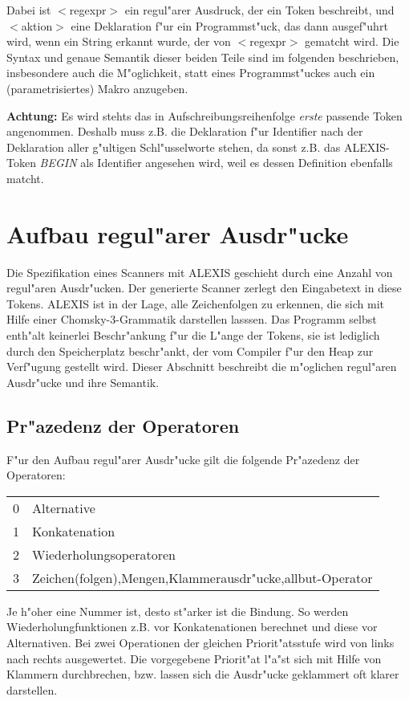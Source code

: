 \medskip

Dabei ist $<$regexpr$>$ ein regul"arer Ausdruck, der ein Token beschreibt, und
$<$aktion$>$ eine Deklaration f"ur ein Programmst"uck, das dann ausgef"uhrt wird,
wenn ein String erkannt wurde, der von $<$regexpr$>$ gematcht wird. Die Syntax und 
genaue Semantik dieser beiden Teile sind im folgenden beschrieben, insbesondere 
auch die M"oglichkeit, statt eines Programmst"uckes auch ein (parametrisiertes)
Makro anzugeben.

{\bf Achtung:} Es wird stehts das in Aufschreibungsreihenfolge {\it erste\/} passende
Token angenommen. Deshalb muss z.B. die Deklaration f"ur Identifier nach der Deklaration
aller g"ultigen Schl"usselworte stehen, da sonst z.B. das ALEXIS-Token {\it BEGIN\/} 
als Identifier angesehen wird, weil es dessen Definition ebenfalls matcht. 
\section{Aufbau regul"arer Ausdr"ucke}
Die Spezifikation eines Scanners mit ALEXIS geschieht durch eine Anzahl von regul"aren
Ausdr"ucken. Der generierte Scanner zerlegt den Eingabetext in diese Tokens.\hfill\break
ALEXIS ist in der Lage, alle Zeichenfolgen zu erkennen, die sich mit Hilfe einer
Chomsky-3-Grammatik darstellen lasssen. Das Programm selbst enth"alt keinerlei
Beschr"ankung f"ur die L"ange der Tokens, sie ist lediglich durch den Speicherplatz 
beschr"ankt, der vom Compiler f"ur den Heap zur Verf"ugung gestellt wird.\hfill\break
Dieser Abschnitt beschreibt die m"oglichen regul"aren Ausdr"ucke und ihre Semantik.
\vfill \eject
\subsection{Pr"azedenz der Operatoren}
F"ur den Aufbau regul"arer Ausdr"ucke gilt die folgende Pr"azedenz der Operatoren:

\medskip

\begin{tabular}{ll}
0&Alternative \\
1&Konkatenation \\
2&Wiederholungsoperatoren \\
3&Zeichen(folgen),Mengen,Klammerausdr"ucke,allbut-Operator\\
\end{tabular}

\medskip

Je h"oher eine Nummer ist, desto st"arker ist die Bindung. So werden Wiederholungfunktionen
z.B. vor Konkatenationen berechnet und diese vor Alternativen. Bei zwei Operationen der
gleichen Priorit"atsstufe wird von links nach rechts ausgewertet. Die vorgegebene Priorit"at
l"a"st sich mit Hilfe von Klammern durchbrechen, bzw. lassen sich die Ausdr"ucke
geklammert oft klarer darstellen.  
